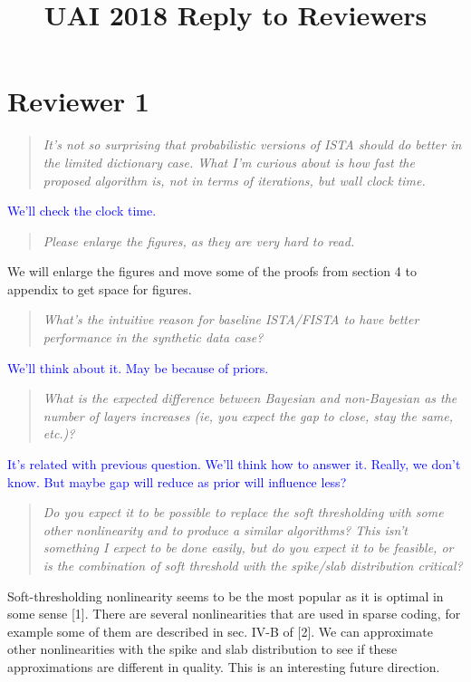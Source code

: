 \documentclass{article}
\begin{document}
\title{UAI 2018 Reply to Reviewers}
\date{}
\maketitle

\section*{Reviewer 1}
\begin{quote}
\textit{It's not so surprising that probabilistic versions of ISTA should do better in the limited dictionary case. What I'm curious about is how fast the proposed algorithm is, not in terms of iterations, but wall clock time.}
\end{quote}
\textcolor{blue}{We'll check the clock time.}

\begin{quote}
\textit{Please enlarge the figures, as they are very hard to read.}
\end{quote}
We will enlarge the figures and move some of the proofs from section 4 to appendix to get space for figures.


\begin{quote}
\textit{What's the intuitive reason for baseline ISTA/FISTA to have better performance in the synthetic data case?}
\end{quote}
\textcolor{blue}{We'll think about it. May be because of priors.}

\begin{quote}
\textit{What is the expected difference between Bayesian and non-Bayesian as the number of layers increases (ie, you expect the gap to close, stay the same, etc.)?}
\end{quote}
\textcolor{blue}{It's related with previous question. We'll think how to answer it. Really, we don't know. But maybe gap will reduce as prior will influence less?}

\begin{quote}
\textit{Do you expect it to be possible to replace the soft thresholding with some other nonlinearity and to produce a similar algorithms? This isn't something I expect to be done easily, but do you expect it to be feasible, or is the combination of soft threshold with the spike/slab distribution critical?}
\end{quote}
Soft-thresholding nonlinearity seems to be the most popular as it is optimal in some sense [1]. There are several nonlinearities that are used in sparse coding, for example some of them are described in sec. IV-B of [2]. We can approximate other nonlinearities with the spike and slab distribution to see if these approximations are different in quality. This is an interesting future direction.
\end{document}
